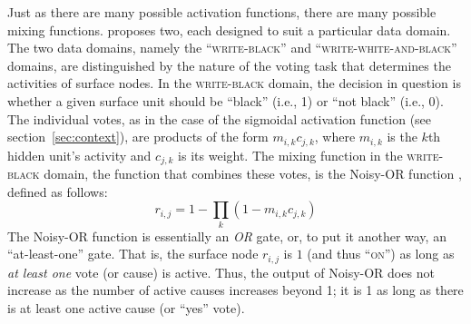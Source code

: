 Just as there are many possible activation functions, there are many 
possible mixing functions.
\citet{saund:94} proposes two, each designed 
to suit a particular data domain.  The two data domains, namely 
the ``\textsc{write-black}'' and ``\textsc{write-white-and-black}'' 
domains, are distinguished by the nature of the voting task that 
determines the activities of surface nodes. 
In the \textsc{write-black} domain, the decision in question is 
 whether a given surface unit should be ``black'' (i.e., 1) or ``not black'' (i.e., 0). 
 The individual votes, as in the case of the sigmoidal activation function (see section~\ref{sec:context}), are products of the form $m_{i,k} c_{j,k}$,
 where $m_{i,k}$ is the $k$th hidden unit's activity and $c_{j,k}$ is its weight.
The mixing function in the \textsc{write-black} domain, the function that combines these votes,
 is the Noisy-OR function \citep{pearl:1988}, defined as follows:
\begin{equation}\label{eq:noisy-or}
r_{i,j} = 1 - \prod\limits_{k} (1 - m_{i,k} c_{j,k})
\end{equation}
 The Noisy-OR function is essentially an \textit{OR} gate, or, to put it another way, 
 an ``at-least-one'' gate. That is, the surface node $r_{i,j}$ is $1$ (and thus ``\textsc{on}'') as long as 
 \emph{at least one} vote (or cause) is active.
Thus, the output of Noisy-OR does not increase
as the number of active causes increases beyond 1; it is 1 as long as there is at least one active cause (or ``yes'' vote).

